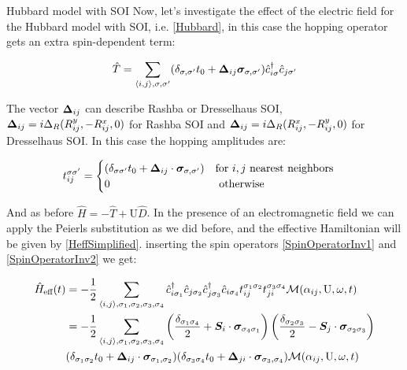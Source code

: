 \begin{section}{Hubbard model with SOI}
\label{Section3HubbardSOI}
Now, let's investigate the effect of the electric field for the Hubbard model with SOI, i.e. \ref{Hubbard}, in this case the hopping operator gets an extra spin-dependent term:

\begin{equation}
\hat{T} = \sum_{\langle i,j \rangle, \sigma, \sigma'}(\delta_{\sigma, \sigma'} t_0 + \boldsymbol{\Delta}_{ij} \boldsymbol{\sigma}_{\sigma, \sigma'})\hat{c}_{i \sigma}^\dagger \hat{c}_{j \sigma'}
\end{equation}

The vector $\boldsymbol{\Delta}_{ij}$ can describe Rashba or Dresselhaus SOI, $\boldsymbol{\Delta}_{ij} = i\Delta_R(R_{ij}^y, -R_{ij}^x, 0)$ for Rashba SOI and $\boldsymbol{\Delta}_{ij} = i\Delta_R(R_{ij}^x, -R_{ij}^y, 0)$ for Dresselhaus SOI. 
In this case the hopping amplitudes are:

\begin{equation}
\label{HoppHubbSOI}
t_{ij}^{\sigma \sigma'} = \begin{cases}
	(\delta_{\sigma \sigma'}t_0+\boldsymbol{\Delta}_{ij} \cdot \boldsymbol{\sigma}_{\sigma, \sigma'}) & \text{for } i, j \text{ nearest neighbors} \\
	0 & \text{ otherwise}
\end{cases} \quad
\end{equation}
 
And as before $\hat{H} = -\hat{T} + \text{U}\hat{D}$. In the presence of an electromagnetic field we can apply the Peierls substitution as we did before, and the effective Hamiltonian will be given by \ref{HeffSimplified}.  inserting the spin operators \ref{SpinOperatorInv1} and \ref{SpinOperatorInv2} we get:

\begin{align}
\hat{H}_{\text{eff}}(t) &= - \frac{1}{2} \sum_{\langle i,j \rangle, \sigma_1, \sigma_2, \sigma_3, \sigma_4}\hat{c}_{i \sigma_1}^\dagger \hat{c}_{j \sigma_2} \hat{c}_{j \sigma_3}^\dagger \hat{c}_{i \sigma_4} t_{ij}^{\sigma_1 \sigma_2} t_{ji}^{\sigma_3 \sigma_4} \mathcal{M}(\alpha_{ij}, \text{U}, \omega, t) \nonumber \\
&= - \frac{1}{2} \sum_{\langle i,j \rangle, \sigma_1, \sigma_2, \sigma_3, \sigma_4} \left( \frac{\delta_{\sigma_1 \sigma_4}}{2} + \boldsymbol{S}_i\cdot\boldsymbol{\sigma}_{\sigma_4 \sigma_1} \right) \left( \frac{\delta_{\sigma_2 \sigma_3}}{2} - \boldsymbol{S}_j\cdot\boldsymbol{\sigma}_{\sigma_2 \sigma_3} \right) \nonumber \\ &(\delta_{\sigma_1 \sigma_2}t_0+\boldsymbol{\Delta}_{ij}\cdot \boldsymbol{\sigma}_{\sigma_1, \sigma_2}) (\delta_{\sigma_3 \sigma_4}t_0+\boldsymbol{\Delta}_{ji}\cdot \boldsymbol{\sigma}_{\sigma_3, \sigma_4}) \mathcal{M}(\alpha_{ij}, \text{U}, \omega, t) \label{HeffHubbSOI1}
\end{align}


\end{section}

